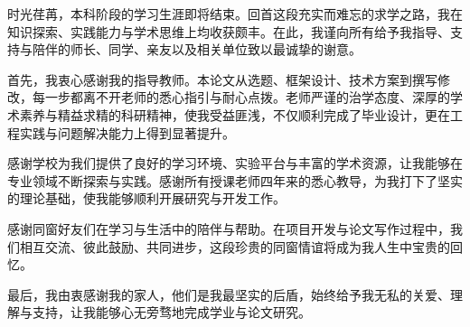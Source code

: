 
\begin{acknowledgements}

\setlength{\parindent}{2em} 
时光荏苒，本科阶段的学习生涯即将结束。回首这段充实而难忘的求学之路，我在知识探索、实践能力与学术思维上均收获颇丰。在此，我谨向所有给予我指导、支持与陪伴的师长、同学、亲友以及相关单位致以最诚挚的谢意。

首先，我衷心感谢我的指导教师。本论文从选题、框架设计、技术方案到撰写修改，每一步都离不开老师的悉心指引与耐心点拨。老师严谨的治学态度、深厚的学术素养与精益求精的科研精神，使我受益匪浅，不仅顺利完成了毕业设计，更在工程实践与问题解决能力上得到显著提升。

感谢学校为我们提供了良好的学习环境、实验平台与丰富的学术资源，让我能够在专业领域不断探索与实践。感谢所有授课老师四年来的悉心教导，为我打下了坚实的理论基础，使我能够顺利开展研究与开发工作。

感谢同窗好友们在学习与生活中的陪伴与帮助。在项目开发与论文写作过程中，我们相互交流、彼此鼓励、共同进步，这段珍贵的同窗情谊将成为我人生中宝贵的回忆。

最后，我由衷感谢我的家人，他们是我最坚实的后盾，始终给予我无私的关爱、理解与支持，让我能够心无旁骛地完成学业与论文研究。

\end{acknowledgements}
